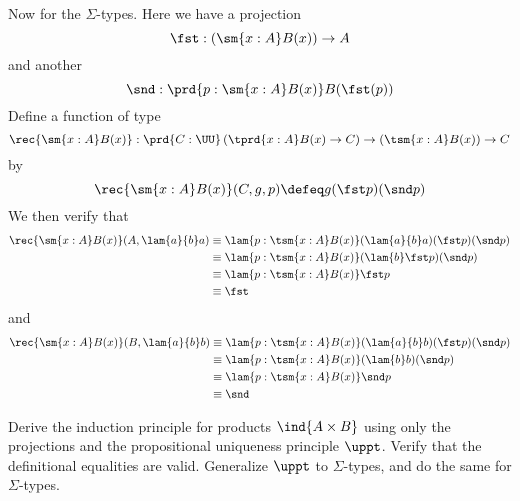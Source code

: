 Now for the $\Sigma$-types.  Here we have a projection
\[
  \fst : \left(\sm{x : A} B(x) \right) \to A
\]
and another
\[
  \snd : \prd{p : \sm{x : A} B(x)} B(\fst (p))
\]
Define a function of type 
\[
  \rec{\sm{x:A}B(x)} : \prd{C:\UU} \left(\tprd{x:A} B(x) \to C \right) \to
  \left(\tsm{x:A}B(x) \right) \to C
\]
by
\[
  \rec{\sm{x:A}B(x)}(C, g, p)
  \defeq
  g(\fst p)(\snd p)
\]
We then verify that
\begin{align*}
  \rec{\sm{x:A}B(x)}(A, \lam{a}{b}a )
  &\equiv
  \lam{p:\tsm{x:A}B(x)}(\lam{a}{b}a )(\fst p)(\snd p)
  \\&\equiv
  \lam{p:\tsm{x:A}B(x)}(\lam{b}\fst p )(\snd p)
  \\&\equiv
  \lam{p:\tsm{x:A}B(x)}\fst p 
  \\&\equiv
  \fst
\end{align*}
and
\begin{align*}
  \rec{\sm{x:A}B(x)}(B, \lam{a}{b}b )
  &\equiv
  \lam{p:\tsm{x:A}B(x)}(\lam{a}{b}b )(\fst p)(\snd p)
  \\&\equiv
  \lam{p:\tsm{x:A}B(x)}(\lam{b}b )(\snd p)
  \\&\equiv
  \lam{p:\tsm{x:A}B(x)}\snd p
  \\&\equiv
  \snd
\end{align*}

 Derive the induction principle for products $\ind{A \times B}$
using only the projections and the propositional uniqueness principle $\uppt$.
Verify that the definitional equalities are valid.  Generalize $\uppt$ to
$\Sigma$-types, and do the same for $\Sigma$-types.

